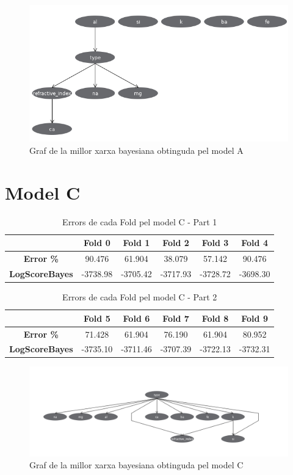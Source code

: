 \documentclass[11pt,a4paper]{article}
\begin{document}
\vspace*{0.5in}

\begin{figure}[hbtp]
\centering
\includegraphics[scale=0.6]{Figures/r4.png}
\caption{Graf de la millor xarxa bayesiana obtinguda pel model A}
\end{figure}

\newpage

\section{Model C}
\vspace*{0.5in}

\begin{table}[htbp]
\center
\begin{tabular}{|c||c|c|c|c|c|}
\hline
 & Fold 0 & Fold 1 & Fold 2 & Fold 3 & Fold 4 \\
\hline \hline
\textbf{Error \%}
 & 90.476 & 61.904 & 38.079 & 57.142 & 90.476\\
\hline
\textbf{LogScoreBayes} 
 & -3738.98 & -3705.42 & -3717.93 & -3728.72 & -3698.30  \\
\hline
\end{tabular}
\caption{Errors de cada Fold pel model C - Part 1}
\end{table}

\vspace*{0.5in}

\begin{table}[htbp]
\center
\begin{tabular}{|c||c|c|c|c|c|}
\hline
 & Fold 5 & Fold 6 & Fold 7 & Fold 8 & Fold 9 \\
\hline \hline
\textbf{Error \%}
 & 71.428 & 61.904 & 76.190 & 61.904 & 80.952\\
\hline
\textbf{LogScoreBayes} 
 & -3735.10 & -3711.46 & -3707.39 & -3722.13 & -3732.31 \\
\hline
\end{tabular}
\caption{Errors de cada Fold pel model C - Part 2}
\end{table}

\vspace*{0.5in}

\begin{figure}[hbtp]
\centering
\includegraphics[scale=0.5]{Figures/r5.png}
\caption{Graf de la millor xarxa bayesiana obtinguda pel model C}
\end{figure}
\end{document}
